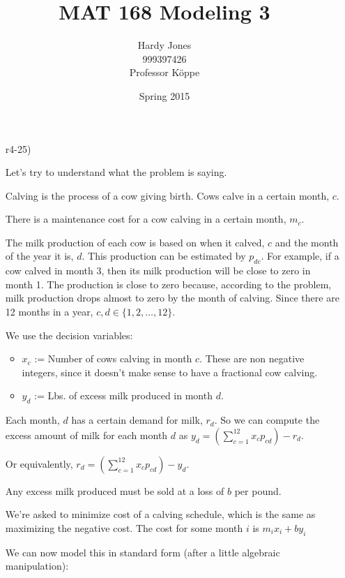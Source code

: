 \documentclass[12pt,letterpaper]{article}
\title{MAT 168 Modeling 3\vspace{-2ex}}
\author{Hardy Jones\\
        999397426\\
        Professor K\"{o}ppe\vspace{-2ex}}
\date{Spring 2015}
\begin{document}
  \maketitle

  \begin{enumerate}
    \item [r4-25)]

      Let's try to understand what the problem is saying.

      Calving is the process of a cow giving birth.
      Cows calve in a certain month, $c$.

      There is a maintenance cost for a cow calving in a certain month, $m_c$.

      The milk production of each cow is based on when it calved, $c$ and the month of the year it is, $d$.
      This production can be estimated by $p_{dc}$.
      For example, if a cow calved in month 3, then its milk production will be close to zero in month 1.
      The production is close to zero because, according to the problem,
      milk production drops almost to zero by the  month of calving.
      Since there are 12 months in a year, $c, d \in \{1, 2, \dots, 12\}$.

      We use the decision variables:

      \begin{itemize}
        \item $x_c$ := Number of cows calving in month $c$. These are non negative integers, since it doesn't make sense to have a fractional cow calving.
        \item $y_d$ := Lbs. of excess milk produced in month $d$.
      \end{itemize}

      Each month, $d$ has a certain demand for milk, $r_d$.
      So we can compute the excess amount of milk for each month $d$ as
      $y_d = \left(\sum\limits_{c = 1}^{12} x_c p_{cd}\right) - r_d$.

      Or equivalently,
      $r_d = \left(\sum\limits_{c = 1}^{12} x_c p_{cd}\right) - y_d$.

      Any excess milk produced must be sold at a loss of $b$ per pound.

      We're asked to minimize cost of a calving schedule,
      which is the same as maximizing the negative cost.
      The cost for some month $i$ is $m_i x_i + b y_i$

      We can now model this in standard form (after a little algebraic manipulation):


\end{enumerate}
\end{document}
